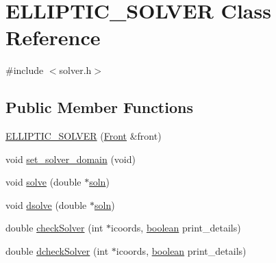 \hypertarget{class_e_l_l_i_p_t_i_c___s_o_l_v_e_r}{}\section{E\+L\+L\+I\+P\+T\+I\+C\+\_\+\+S\+O\+L\+V\+ER Class Reference}
\label{class_e_l_l_i_p_t_i_c___s_o_l_v_e_r}


{\ttfamily \#include $<$solver.\+h$>$}

\subsection*{Public Member Functions}
\begin{DoxyCompactItemize}
\item 
\hyperlink{class_e_l_l_i_p_t_i_c___s_o_l_v_e_r_a699c94ed0a89316c184792f9859917fc}{E\+L\+L\+I\+P\+T\+I\+C\+\_\+\+S\+O\+L\+V\+ER} (\hyperlink{fdecs_8h_ac32202b798f848095c489cfd04c4ca5f}{Front} \&front)
\item 
void \hyperlink{class_e_l_l_i_p_t_i_c___s_o_l_v_e_r_ad2caec519855b29c9bef7e1cd6699343}{set\+\_\+solver\+\_\+domain} (void)
\item 
void \hyperlink{class_e_l_l_i_p_t_i_c___s_o_l_v_e_r_a15f7218487d9ebc1e81cebbc12d4bd37}{solve} (double $\ast$\hyperlink{class_e_l_l_i_p_t_i_c___s_o_l_v_e_r_afd88e462b1adb1a09c1a155509d3a4bc}{soln})
\item 
void \hyperlink{class_e_l_l_i_p_t_i_c___s_o_l_v_e_r_a2a9812013890afd03001fba9f642af5e}{dsolve} (double $\ast$\hyperlink{class_e_l_l_i_p_t_i_c___s_o_l_v_e_r_afd88e462b1adb1a09c1a155509d3a4bc}{soln})
\item 
double \hyperlink{class_e_l_l_i_p_t_i_c___s_o_l_v_e_r_a5b3f819749313263d573651300d1c777}{check\+Solver} (int $\ast$icoords, \hyperlink{cdecs_8h_ad048433382a936258fb49e2ec4f148e1}{boolean} print\+\_\+details)
\item 
double \hyperlink{class_e_l_l_i_p_t_i_c___s_o_l_v_e_r_ae404e549d0fa91ac49f6cab515961d8e}{dcheck\+Solver} (int $\ast$icoords, \hyperlink{cdecs_8h_ad048433382a936258fb49e2ec4f148e1}{boolean} print\+\_\+details)
\end{DoxyCompactItemize}
